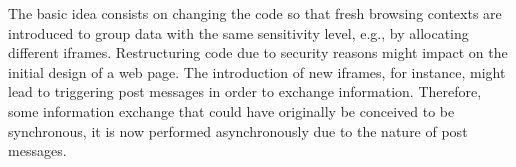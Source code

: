 The basic idea consists on changing the code so that fresh browsing contexts are
introduced to group data with the same sensitivity level, e.g., by allocating
different iframes.  Restructuring code due to security reasons might impact on
the initial design of a web page. The introduction of new iframes, for instance,
might lead to triggering post messages in order to exchange
information. Therefore, some information exchange that could have 
originally be conceived to be synchronous, it is now performed asynchronously due to the
nature of post messages. 
















